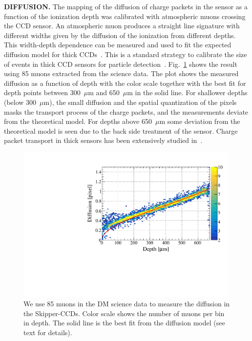 \documentclass[aps,prl,twocolumn,showpacs,superscriptaddress,preprintnumbers]{revtex4-1}
\begin{document}
\vskip 3mm
\noindent\textbf{DIFFUSION.}
The mapping of the diffusion of charge packets in the sensor as a function of the ionization depth was calibrated with atmospheric muons crossing the CCD sensor. An atmospheric muon produces a straight line signature with different widths given by the diffusion of the ionization from  different depths. This width-depth dependence can be measured and used to fit the expected diffusion model for thick CCDs~\cite{Holland:2003}. This is a standard strategy to calibrate the size of events in thick CCD sensors for particle detection~\cite{Aguilar-Arevalo:2016ndq, CONNIE_2019}. Fig.~\ref{fig:diffusion_calibration} shows the result using 85 muons extracted from the science data. The plot shows the measured diffusion as a function of depth with the color scale together with the best fit for depth points between 300~$\mu$m and 650~$\mu$m in the solid line. For shallower depths (below 300~$\mu$m), the small diffusion and the spatial quantization of the pixels masks the transport process of the charge packets, and the measurements deviate from the theoretical model. For depths above 650~$\mu$m some deviation from the theoretical model is seen due to the back side treatment of the sensor. Charge packet transport in thick sensors has been extensively studied in~\cite{Haro_2020}.

\begin{figure}[t!]
\begin{center}
\includegraphics[width=0.99\textwidth]{figs/all_depth_diffusion_measuements_2.pdf}
\caption{We use 85 muons in the DM science data to measure the diffusion in the Skipper-CCDs.  Color scale shows the number of muons per bin in depth.  The solid line is the best fit from the diffusion model (see text for details).}
\label{fig:diffusion_calibration}
\end{center}
\end{figure}
\end{document}

